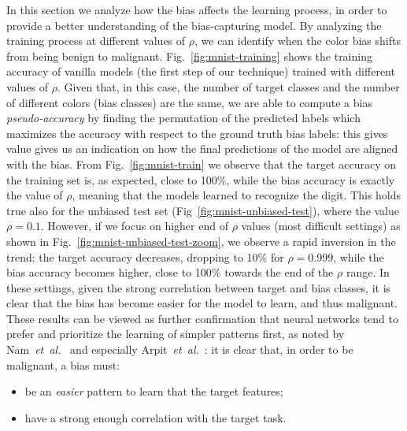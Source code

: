 In this section we analyze how the bias affects the learning process, in order to provide a better understanding of the bias-capturing model.
By analyzing the training process at different values of $\rho$, we can identify when the color bias shifts from being benign to malignant. Fig.~\ref{fig:mnist-training} shows the training accuracy of vanilla models (the first step of our technique) trained with different values of $\rho$. Given that, in this case, the number of target classes and the number of different colors (bias classes) are the same, we are able to compute a bias \emph{pseudo-accuracy}
by finding the permutation of the predicted labels which maximizes the accuracy with respect to the ground truth bias labels: this gives value gives us an indication on how the final predictions of the model are aligned with the bias. 
From Fig.~\ref{fig:mnist-train} we observe that the target accuracy on the training set is, as expected, close to 100\%, while the bias accuracy is exactly the value of $\rho$, meaning that the models learned to recognize the digit.
This holds true also for the unbiased test set (Fig~\ref{fig:mnist-unbiased-test}), where the value $\rho=0.1$. However, if we focus on higher end of $\rho$ values (most difficult settings) as shown in Fig.~\ref{fig:mnist-unbiased-test-zoom}, we observe a rapid inversion in the trend: the target accuracy decreases, dropping to 10\% for $\rho=0.999$, while the bias accuracy becomes higher, close to 100\% towards the end of the $\rho$ range. In these settings, given the strong correlation between target and bias classes, it is clear that the bias has become easier for the model to learn, and thus malignant. These results can be viewed as further confirmation that neural networks tend to prefer and prioritize the learning of simpler patterns first, as noted by Nam~\emph{et~al.}~\cite{nam2020learning} and especially
Arpit~\emph{et~al.}~\cite{arpit2017memorization}: it is clear that, in order to be malignant, a bias must:

\begin{itemize}
    \item be an \emph{easier} pattern to learn that the target features;
    \item have a strong enough correlation with the target task.
\end{itemize}



